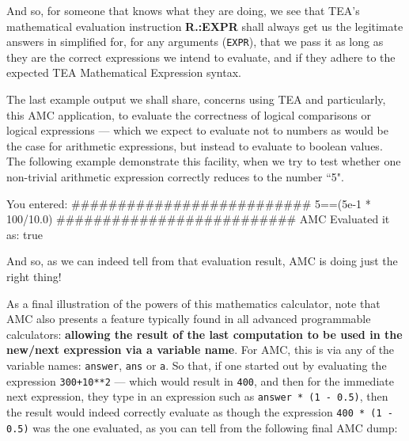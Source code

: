 \documentclass[a4paper, 18pt]{book} %
\begin{document}
{{{\vspace{2em}

And so, for someone that knows what they are doing, we see that TEA's mathematical evaluation instruction \textbf{R.:EXPR} shall always get us the legitimate answers in simplified for, for any arguments (\texttt{EXPR}), that we pass it as long as they are the correct expressions we intend to evaluate, and if they adhere to the expected TEA Mathematical Expression syntax.

\vspace{2em}

The last example output we shall share, concerns using TEA and particularly, this AMC application, to evaluate the correctness of logical comparisons or logical expressions --- which we expect to evaluate not to numbers as would be the case for arithmetic expressions, but instead to evaluate to boolean values. The following example demonstrate this facility, when we try to test whether one non-trivial arithmetic expression correctly reduces to the number ``5".

\vspace{2em}


     \begin{tcbverbatim}[title=Sample OUTPUT 6 from AMC v3.1]
You entered:
##########################
5==(5e-1 * 100/10.0)
##########################
AMC Evaluated it as: true
  \end{tcbverbatim}

\vspace{1em}

And so, as we can indeed tell from that evaluation result, AMC is doing just the right thing!

\vspace{2em}


As a final illustration of the powers of this mathematics calculator, note that AMC also presents a feature typically found in all advanced programmable calculators: \textbf{allowing the result of the last computation to be used in the new/next expression via a variable name}. For AMC, this is via any of the variable names: \texttt{answer}, \texttt{ans} or \texttt{a}. So that, if one started out by evaluating the expression \texttt{300+10**2} --- which would result in \texttt{400}, and then for the immediate next expression, they type in an expression such as \texttt{answer * (1 - 0.5)}, then the result would indeed correctly evaluate as though the expression \texttt{400 * (1 - 0.5)} was the one evaluated, as you can tell from the following final AMC dump:


}}}
\end{document}
